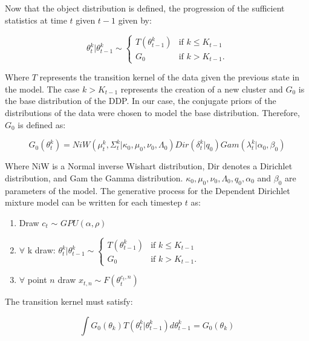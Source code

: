 \documentclass[twoside,hidelinks]{article}
\begin{document}
Now that the object distribution is defined, the progression of the sufficient statistics at time $t$ given $t-1$ given by:

   \begin{center}
\begin{equation}
    \theta_t^k | \theta_{t-1}^k \sim
   \begin{cases} T (\theta_{t-1}^k) &\mbox{if } k \leq K_{t-1} \\
   G_0 & \mbox{if } k > K_{t-1}. \end{cases}
\end{equation}
   \end{center}
Where $T$ represents the transition kernel of the data given the previous state in the model. The case $ k > K_{t-1} $ represents the creation of a new cluster and $G_0$ is the base distribution of the DDP. In our case, the conjugate priors of the distributions of the data were chosen to model the base distribution. Therefore, $G_0$ is defined as:

\begin{equation}
 G_0(\theta_t^k)  = NiW( \mu_t^k, \Sigma_t^k | \kappa_0, \mu_0, \nu_0, \Lambda_0 ) Dir(\delta_t^k | q_0) Gam( \lambda_t^k | \alpha_0, \beta_0)
 \end{equation}

Where NiW is a Normal inverse Wishart distribution, Dir denotes a Dirichlet distribution, and Gam the Gamma distribution. $ \kappa_0, \mu_0, \nu_0, \Lambda_0, q_0,\alpha_0$ and $\beta_0$ are parameters of the model. The generative process for the Dependent Dirichlet mixture model can be written for each timestep $t$ as:

\noindent\makebox[\linewidth]{\rule{\textwidth}{0.4pt}}
\begin{enumerate}
	\item Draw  $c_t$ $\sim$ $GPU(\alpha, \rho) $
	\item $\forall$  k draw: $ \theta_t^k | \theta_{t-1}^k \sim
	\begin{cases} T (\theta_{t-1}^k) &\mbox{if } k \leq K_{t-1} \\
	G_0 & \mbox{if } k > K_{t-1}. \end{cases}$
	\item $\forall$  point $n$ draw $ x_{t,n} \sim F(\theta_t^{c_t,n})$
\end{enumerate}
\noindent\makebox[\linewidth]{\rule{\textwidth}{0.4pt}}
The transition kernel must satisfy\cite{caron}:

\begin{equation}
\int G_0(\theta_k) T(\theta_t^k | \theta_{t-1}^k) d\theta_{t-1}^k =  G_0(\theta_k)
\end{equation}
\end{document}
